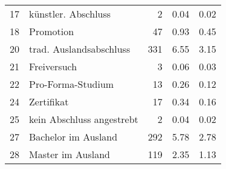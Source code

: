 \begin{longtable}{lXrrr}
        17 & \multicolumn{1}{X}{künstler. Abschluss} & %
          \num{2} &
          \num[round-mode=places,round-precision=2]{0,04} &
          \num[round-mode=places,round-precision=2]{0,02} \\

        18 & \multicolumn{1}{X}{Promotion} & %
          \num{47} &
          \num[round-mode=places,round-precision=2]{0,93} &
          \num[round-mode=places,round-precision=2]{0,45} \\

        20 & \multicolumn{1}{X}{trad. Auslandsabschluss} & %
          \num{331} &
          \num[round-mode=places,round-precision=2]{6,55} &
          \num[round-mode=places,round-precision=2]{3,15} \\

        21 & \multicolumn{1}{X}{Freiversuch} & %
          \num{3} &
          \num[round-mode=places,round-precision=2]{0,06} &
          \num[round-mode=places,round-precision=2]{0,03} \\

        22 & \multicolumn{1}{X}{Pro-Forma-Studium} & %
          \num{13} &
          \num[round-mode=places,round-precision=2]{0,26} &
          \num[round-mode=places,round-precision=2]{0,12} \\

        24 & \multicolumn{1}{X}{Zertifikat} & %
          \num{17} &
          \num[round-mode=places,round-precision=2]{0,34} &
          \num[round-mode=places,round-precision=2]{0,16} \\

        25 & \multicolumn{1}{X}{kein Abschluss angestrebt} & %
          \num{2} &
          \num[round-mode=places,round-precision=2]{0,04} &
          \num[round-mode=places,round-precision=2]{0,02} \\

        27 & \multicolumn{1}{X}{Bachelor im Ausland} & %
          \num{292} &
          \num[round-mode=places,round-precision=2]{5,78} &
          \num[round-mode=places,round-precision=2]{2,78} \\

        28 & \multicolumn{1}{X}{Master im Ausland} & %
          \num{119} &
          \num[round-mode=places,round-precision=2]{2,35} &
          \num[round-mode=places,round-precision=2]{1,13} \\


\end{longtable}
